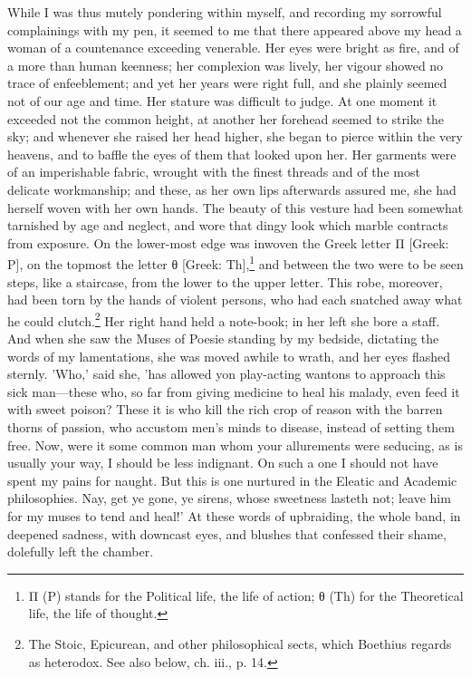 While I was thus mutely pondering within myself, and recording my
sorrowful complainings with my pen, it seemed to me that there appeared
above my head a woman of a countenance exceeding venerable. Her eyes
were bright as fire, and of a more than human keenness; her complexion
was lively, her vigour showed no trace of enfeeblement; and yet her
years were right full, and she plainly seemed not of our age and time.
Her stature was difficult to judge. At one moment it exceeded not the
common height, at another her forehead seemed to strike the sky; and
whenever she raised her head higher, she began to pierce within the very
heavens, and to baffle the eyes of them that looked upon her. Her
garments were of an imperishable fabric, wrought with the finest threads
and of the most delicate workmanship; and these, as her own lips
afterwards assured me, she had herself woven with her own hands. The
beauty of this vesture had been somewhat tarnished by age and neglect,
and wore that dingy look which marble contracts from exposure. On the
lower-most edge was inwoven the Greek letter Π [Greek: P], on the topmost
the letter θ [Greek: Th],\footnote{Π (P) stands for the Political life, the life of
action; θ (Th) for the Theoretical life, the life of thought.} and between the two were to be seen steps,
like a staircase, from the lower to the upper letter. This robe,
moreover, had been torn by the hands of violent persons, who had each
snatched away what he could clutch.\footnote{The Stoic, Epicurean, and other philosophical sects, which
Boethius regards as heterodox. See also below, ch. iii., p. 14.} Her right hand held a note-book;
in her left she bore a staff. And when she saw the Muses of Poesie
standing by my bedside, dictating the words of my lamentations, she was
moved awhile to wrath, and her eyes flashed sternly. 'Who,' said she,
'has allowed yon play-acting wantons to approach this sick man—these
who, so far from giving medicine to heal his malady, even feed it with
sweet poison? These it is who kill the rich crop of reason with the
barren thorns of passion, who accustom men's minds to disease, instead
of setting them free. Now, were it some common man whom your allurements
were seducing, as is usually your way, I should be less indignant. On
such a one I should not have spent my pains for naught. But this is one
nurtured in the Eleatic and Academic philosophies. Nay, get ye gone, ye
sirens, whose sweetness lasteth not; leave him for my muses to tend and
heal!' At these words of upbraiding, the whole band, in deepened
sadness, with downcast eyes, and blushes that confessed their shame,
dolefully left the chamber.


